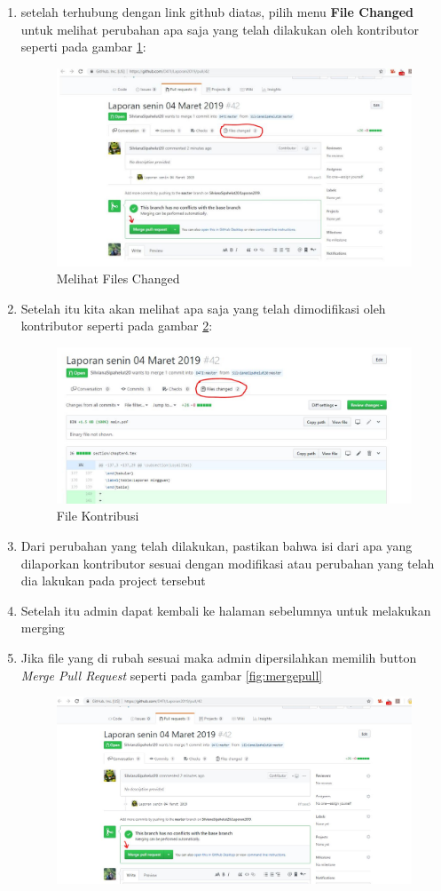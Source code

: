 \begin{enumerate}
\begin{figure}[!htbp]
\end{figure}
\item setelah terhubung dengan link github diatas, pilih menu \textbf{File Changed} untuk melihat perubahan apa saja yang telah dilakukan oleh kontributor seperti pada gambar \ref{fig:changed}:
\subitem
\begin{figure}[!htbp]
\centerline{\includegraphics[width=.75\textwidth]{Figures/membacapr/changed.JPG}}
\caption{Melihat Files Changed}
\label{fig:changed}
\end{figure}
\item Setelah itu kita akan melihat apa saja yang telah dimodifikasi oleh kontributor seperti pada gambar \ref{fig:files}:
\subitem
\begin{figure}[!htbp]
\centerline{\includegraphics[width=.75\textwidth]{Figures/membacapr/mr7.JPG}}
\caption{File Kontribusi}
\label{fig:files}
\end{figure}
\item Dari perubahan yang telah dilakukan, pastikan bahwa isi dari apa yang dilaporkan kontributor sesuai dengan modifikasi atau perubahan yang telah dia lakukan pada project tersebut
\item Setelah itu admin dapat kembali ke halaman sebelumnya untuk melakukan merging
\item Jika file yang di rubah sesuai maka admin dipersilahkan memilih button \textit{Merge Pull Request} seperti pada gambar \ref{fig:mergepull}
\subitem
\begin{figure}[!htbp]
\centerline{\includegraphics[width=.75\textwidth]{Figures/membacapr/mr3.JPG}}

\end{figure}
\end{enumerate}
